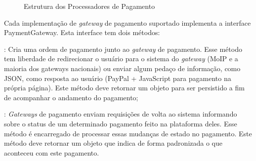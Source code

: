 \begin{figure}[H]
	\caption{\label{fig:uml_strategy}Estrutura dos Processadores de Pagamento}
    \centering
\end{figure}

Cada implementação de \emph{gateway} de pagamento suportado implementa a interface PaymentGateway. Esta interface tem dois métodos:

\begin{lista}
  \item \textbf{}: Cria uma ordem de pagamento junto ao \emph{gateway} de pagamento. Esse método tem liberdade de redirecionar o usuário para o sistema do \emph{gateway} (MoIP e a maioria dos gateways nacionais) ou enviar algum pedaço de informação, como JSON, como resposta ao usuário (PayPal + JavaScript para pagamento na própria página). Este método deve retornar um objeto  para ser persistido a fim de acompanhar o andamento do pagamento;

  \item \textbf{}: \emph{Gateways} de pagamento enviam requisições de volta ao sistema informando sobre o status de um determinado pagamento feito na plataforma deles. Esse método é encarregado de processar essas mudanças de estado no pagamento. Este método deve retornar um objeto  que indica de forma padronizada o que aconteceu com este pagamento.
\end{lista}

